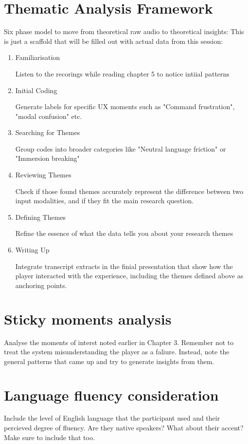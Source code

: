 
\section{Thematic Analysis Framework}
Six phase model to move from theoretical raw audio to theoretical insights:
This is just a scaffold that will be filled out with actual data from this session:


\begin{enumerate}
    \item Familiarisation
    
    Listen to the recorings while reading chapter 5 to notice intiial patterns

    \item Initial Coding
    
    Generate labels for specific UX moments such as "Command frustration", "modal confusion" etc.

    \item Searching for Themes
    
    Group codes into broader categories like "Neutral language friction" or "Immersion breaking"

    \item Reviewing Themes
    
    Check if those found themes accurately represent the difference between two input modalities, 
    and if they fit the main research question.

    \item Defining Themes
    
    Refine the essence of what the data tells you about your research themes

    \item Writing Up
    
    Integrate transcript extracts in the finial presentation that show how the player 
    interacted with the experience, including the themes defined above as anchoring points.

\end{enumerate}

\section{Sticky moments analysis}

Analyse the moments of interst noted earlier in Chapter 3. Remember not to treat the system misunderstanding the player as a faliure.
Instead, note the general patterns that came up and try to generate insights from them.

\section{Language fluency consideration}

Include the level of English language that the participant used and their percieved degree of fluency.
Are they native speakers? What about their accent? Make sure to include that too.